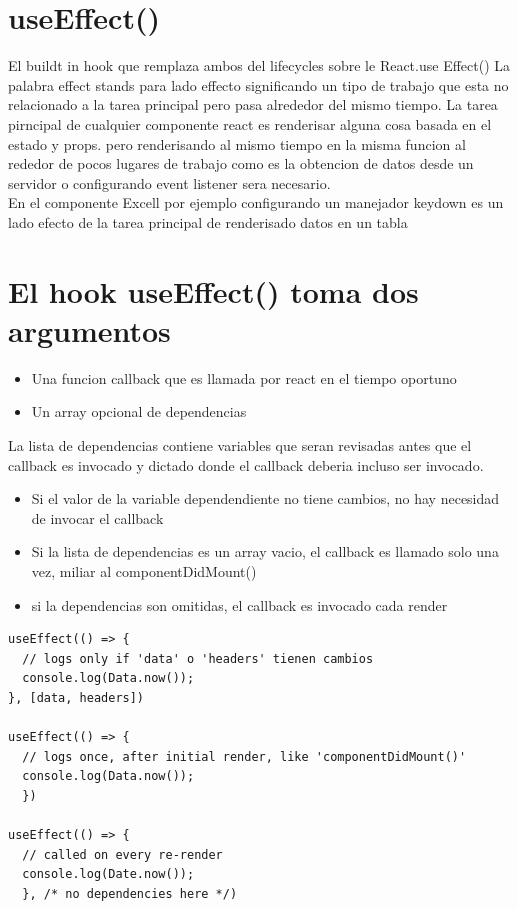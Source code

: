 \section{useEffect()}
El buildt in hook que remplaza ambos del lifecycles sobre le React.use Effect()
La palabra effect stands para lado effecto significando un tipo de trabajo que esta no relacionado a la tarea principal pero pasa alrededor del mismo tiempo. La tarea pirncipal de cualquier componente react es renderisar alguna cosa basada en el estado y props. pero renderisando al mismo tiempo en la misma funcion al rededor de pocos lugares de trabajo como es la obtencion de datos desde un servidor o configurando event listener sera necesario.
\\
En el componente Excell por ejemplo configurando un manejador keydown es un lado efecto de la tarea principal de renderisado datos en un tabla
\section{El hook useEffect() toma dos argumentos}
\begin{itemize}
  \item Una funcion callback que es llamada por react en el tiempo oportuno
  \item Un array opcional de dependencias
\end{itemize}
La lista de dependencias contiene variables que seran revisadas antes que el callback es invocado y dictado donde el callback deberia incluso ser invocado.
\begin{itemize}
  \item Si el valor de la variable dependendiente no tiene cambios, no hay necesidad de invocar el callback
  \item Si la lista de dependencias es un array vacio, el callback es llamado solo una vez, miliar al componentDidMount()
  \item si la dependencias son omitidas, el callback es invocado cada render
\end{itemize}
\begin{lstlisting}[language=html]
useEffect(() => {
  // logs only if 'data' o 'headers' tienen cambios
  console.log(Data.now());
}, [data, headers])

useEffect(() => {
  // logs once, after initial render, like 'componentDidMount()'
  console.log(Data.now());
  })

useEffect(() => {
  // called on every re-render
  console.log(Date.now());
  }, /* no dependencies here */)
\end{lstlisting}
